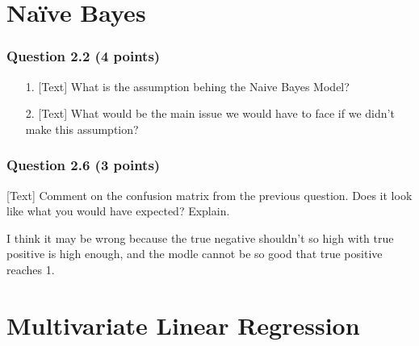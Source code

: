 \documentclass[12pt]{article}
\begin{document}
\clearpage
{}
% 


\section*{Na\"ive Bayes}
\subsubsection*{Question 2.2 (4 points)}
\begin{enumerate}
    \item [1.] [Text] What is the assumption behing the Naive Bayes Model?
    \item [2.] [Text] What would be the main issue we would have to face if we didn't make this assumption?
\end{enumerate}




\subsubsection*{Question 2.6 (3 points)}
[Text] Comment on the confusion matrix from the previous question. Does it look like what you would have expected? Explain.





  I think it may be wrong because the true negative shouldn't so high with true positive is high enough, and the modle cannot be so good that true positive reaches 1.




% 


\section*{Multivariate Linear Regression}
\end{document}
